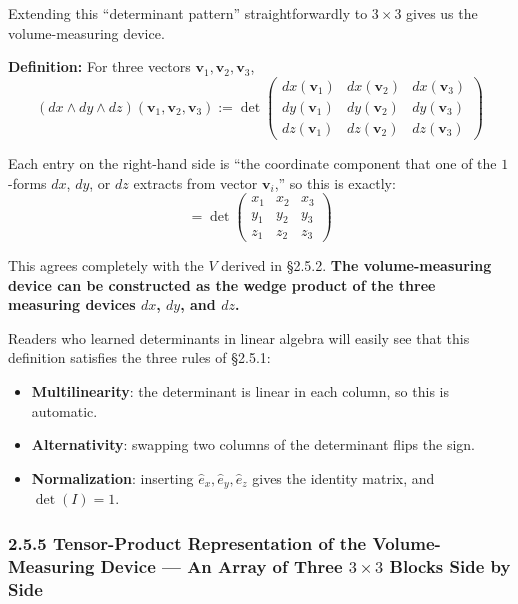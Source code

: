 Extending this ``determinant pattern'' straightforwardly to
\(3 \times 3\) gives us the volume-measuring device.

\textbf{Definition:} For three vectors
\(\mathbf{v}_1, \mathbf{v}_2, \mathbf{v}_3\),
\[(dx \wedge dy \wedge dz)(\mathbf{v}_1, \mathbf{v}_2, \mathbf{v}_3) := \det\begin{pmatrix} dx(\mathbf{v}_1) & dx(\mathbf{v}_2) & dx(\mathbf{v}_3) \\ dy(\mathbf{v}_1) & dy(\mathbf{v}_2) & dy(\mathbf{v}_3) \\ dz(\mathbf{v}_1) & dz(\mathbf{v}_2) & dz(\mathbf{v}_3) \end{pmatrix}\]

Each entry on the right-hand side is ``the coordinate component that one
of the \(1\)-forms \(dx\), \(dy\), or \(dz\) extracts from vector
\(\mathbf{v}_i\),'' so this is exactly:
\[= \det\begin{pmatrix} x_1 & x_2 & x_3 \\ y_1 & y_2 & y_3 \\ z_1 & z_2 & z_3 \end{pmatrix}\]

This agrees completely with the \(V\) derived in §2.5.2. \textbf{The
volume-measuring device can be constructed as the wedge product of the
three measuring devices \(dx\), \(dy\), and \(dz\).}

Readers who learned determinants in linear algebra will easily see that
this definition satisfies the three rules of §2.5.1:

\begin{itemize}
\item
  \textbf{Multilinearity}: the determinant is linear in each column, so
  this is automatic.
\item
  \textbf{Alternativity}: swapping two columns of the determinant flips
  the sign.
\item
  \textbf{Normalization}: inserting \(\hat{e}_x, \hat{e}_y, \hat{e}_z\)
  gives the identity matrix, and \(\det(I) = 1\).
\end{itemize}

\hypertarget{tensor-product-representation-of-the-volume-measuring-device-an-array-of-three-3-times-3-blocks-side-by-side}{%
\subsubsection{\texorpdfstring{2.5.5 Tensor-Product Representation of
the Volume-Measuring Device --- An Array of Three \(3 \times 3\) Blocks
Side by
Side}{2.5.5 Tensor-Product Representation of the Volume-Measuring Device --- An Array of Three 3 \textbackslash times 3 Blocks Side by Side}}\label{tensor-product-representation-of-the-volume-measuring-device-an-array-of-three-3-times-3-blocks-side-by-side}}

